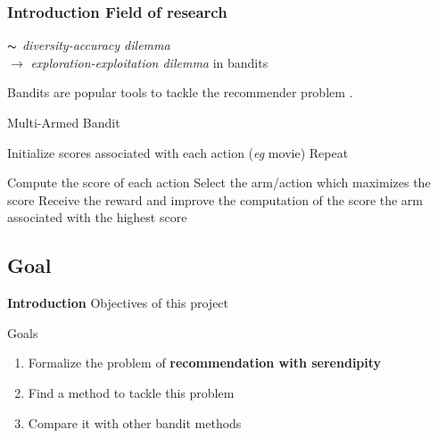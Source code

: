 \documentclass[10pt,frenchb]{beamer}
\newlength\myindent
\newcommand\bindent{%
  \begingroup
  \setlength{\itemindent}{\myindent}
  \addtolength{\algorithmicindent}{\myindent}
}
\newcommand\eindent{\endgroup}
\begin{document}
\begin{frame}
\frametitle{\textbf{Introduction} Field of research}

\begin{center} $\thicksim$ \emph{diversity-accuracy dilemma} \cite{zhou2010solving}\\
$\rightarrow$ \emph{exploration-exploitation dilemma} in bandits\end{center}

\begin{center}
Bandits are popular tools to tackle the recommender problem \cite{koutrika2018recent,mary2015bandits,guillou2016large}.
\end{center}

\begin{algorithm}[H]
\caption{Multi-Armed Bandit}
\begin{algorithmic}[1]
\STATE Initialize scores associated with each action (\emph{eg} movie)
\STATE Repeat
\bindent
\STATE Compute the score of each action
\STATE Select the arm/action which maximizes the score
\STATE Receive the reward and improve the computation of the score
\eindent
\RETURN the arm associated with the highest score
\end{algorithmic}
\end{algorithm}

\end{frame}

\subsection{Goal}

\begin{frame}{\textbf{Introduction} Objectives of this project}

\begin{alertblock}{Goals}
\bigskip

\begin{enumerate}
\item Formalize the problem of \textbf{recommendation with serendipity}
\pause
\item Find a method to tackle this problem
\pause
\item Compare it with other bandit methods
\end{enumerate}
\bigskip

\end{alertblock}


\end{frame}
\end{document}
